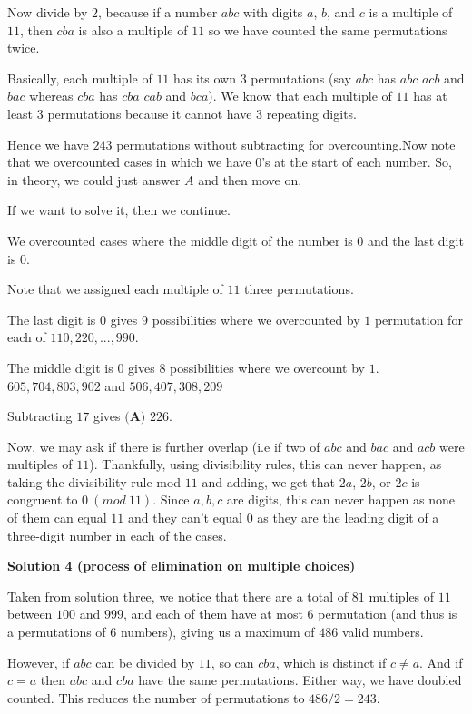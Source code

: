 \begin{enumerate}
 Now divide by $2$, because if a number $abc$ with digits $a$, $b$, and $c$ is a multiple of $11$, then $cba$ is also a multiple of $11$ so we have counted the same permutations twice. 

 Basically, each multiple of $11$ has its own $3$ permutations (say $abc$ has $abc$ $acb$ and $bac$ whereas $cba$ has $cba$ $cab$ and $bca$). We know that each multiple of $11$ has at least $3$ permutations because it cannot have $3$ repeating digits.

 Hence we have $243$ permutations without subtracting for overcounting.Now note that we overcounted cases in which we have $0$'s at the start of each number. So, in theory, we could just answer $A$ and then move on.

 If we want to solve it, then we continue.

 We overcounted cases where the middle digit of the number is $0$ and the last digit is $0$.

 Note that we assigned each multiple of $11$ three permutations.

 The last digit is $0$ gives $9$ possibilities where we overcounted by $1$ permutation for each of $110, 220, ... , 990$.

 The middle digit is $0$ gives $8$ possibilities where we overcount by $1$.$605, 704, 803, 902$ and $506, 407, 308, 209$

 Subtracting $17$ gives $\boxed{\textbf{(A) } 226}$.

 Now, we may ask if there is further overlap (i.e if two of $abc$ and $bac$ and $acb$ were multiples of $11$). Thankfully, using divisibility rules, this can never happen, as taking the divisibility rule mod $11$ and adding, we get that $2a$, $2b$, or $2c$  is congruent to $0\ (mod\ 11)$. Since $a, b, c$ are digits, this can never happen as none of them can equal $11$ and they can't equal $0$ as they are the leading digit of a three-digit number in each of the cases.

 



\textbf{Solution 4 (process of elimination on multiple choices)}

Taken from solution three, we notice that there are a total of $81$ multiples of $11$ between $100$ and $999$, and each of them have at most $6$ permutation (and thus is a permutations of $6$ numbers), giving us a maximum of $486$ valid numbers. 

 However, if $abc$ can be divided by $11$, so can $cba$, which is distinct if $c \neq a$. And if $c = a$ then $abc$ and $cba$ have the same permutations. Either way, we have doubled counted. This reduces the number of permutations to $486/2 =  243$. 


\end{enumerate}
